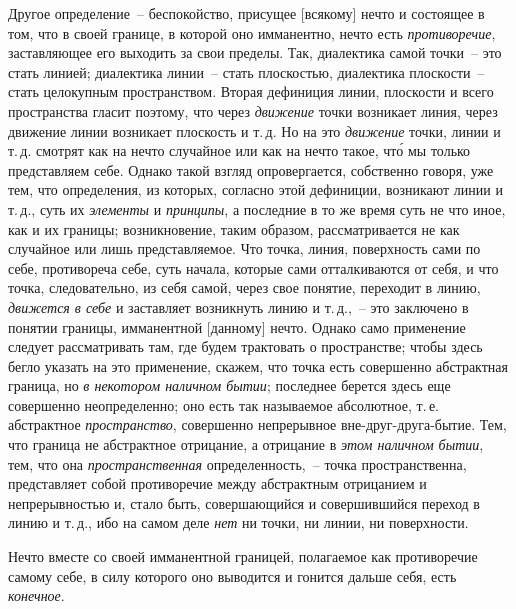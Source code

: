 Другое определение~-- беспокойство, присущее [всякому]
нечто и состоящее в том, что в своей границе, в
которой оно имманентно, нечто есть \emph{противоречие}, заставляющее
его выходить за свои пределы. Так, диалектика
самой точки~-- это стать линией; диалектика линии~--
стать плоскостью, диалектика плоскости~-- стать целокупным
пространством. Вторая дефиниция линии, плоскости
и всего пространства гласит поэтому, что через
\emph{движение} точки возникает линия, через движение линии
возникает плоскость и т.\,д. Но на это \emph{движение} точки,
линии и т.\,д. смотрят как на нечто случайное или как
на нечто такое, чт\'о мы только представляем себе. Однако
такой взгляд опровергается, собственно говоря, уже тем,
что определения, из которых, согласно этой дефиниции,
возникают линии и т.\,д., суть их \emph{элементы} и \emph{принципы},
а последние в то же время суть не что иное, как и их границы;
возникновение, таким образом, рассматривается
не как случайное или лишь представляемое. Что точка,
линия, поверхность сами по себе, противореча себе, суть
начала, которые сами отталкиваются от себя, и что точка,
следовательно, из себя самой, через свое понятие,
переходит в линию, \emph{движется в себе} и заставляет возникнуть
линию и т.\,д.,~-- это заключено в понятии границы,
имманентной [данному] нечто. Однако само применение
следует рассматривать там, где будем трактовать
о пространстве; чтобы здесь бегло указать на это применение,
скажем, что точка есть совершенно абстрактная
граница, но \emph{в некотором наличном бытии}; последнее берется
здесь еще совершенно неопределенно; оно есть так
называемое абсолютное, т.\,е. абстрактное \emph{пространство},
совершенно непрерывное вне-друг-друга-бытие. Тем, что
граница не абстрактное отрицание, а отрицание в \emph{этом
наличном бытии}, тем, что она \emph{пространственная} определенность,~--
точка пространственна, представляет собой
противоречие между абстрактным отрицанием и непрерывностью
и, стало быть, совершающийся и совершившийся
переход в линию и т.\,д., ибо на самом деле \emph{нет}
ни точки, ни линии, ни поверхности.

Нечто вместе со своей имманентной границей, полагаемое
как противоречие самому себе, в силу которого
оно выводится и гонится дальше себя, есть \emph{конечное}.


